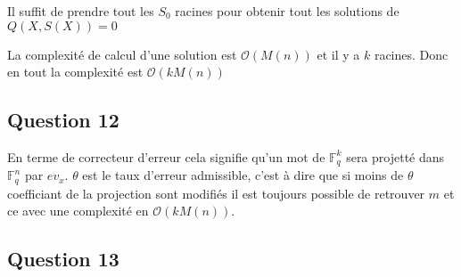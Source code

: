 \documentclass{article}
\newcommand{\FF}{\mathbb{F}}
\newcommand{\OO}[1]{\mathcal{O}\left( #1 \right )}
\begin{document}
Il suffit de prendre tout les $S_0$ racines pour obtenir tout les solutions de $Q(X,S(X))=0$

 La complexité de calcul d'une solution est $\OO{M(n)}$ et il y a $k$ racines. Donc en tout la complexité est $\OO{kM(n)}$

\subsection*{Question 12}

En terme de correcteur d'erreur cela signifie qu'un mot de $\FF_q^k$  sera projetté dans $\FF_q^n$ par $ev_x$.   $\theta$ est le taux d'erreur admissible, c'est à dire que si moins de $\theta$ coefficiant de la projection sont modifiés il est toujours possible de retrouver $m$ et ce avec une complexité en $\OO{kM(n)}$. 

\subsection*{Question 13}
\end{document}
